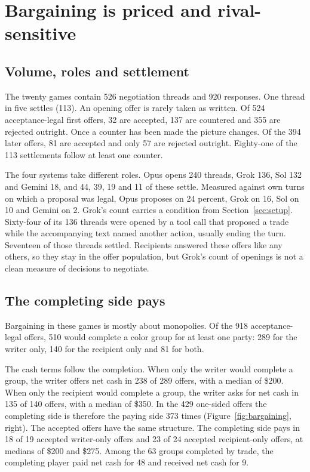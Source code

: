 \section{Bargaining is priced and rival-sensitive}
\label{sec:bargaining}

\subsection{Volume, roles and settlement}

The twenty games contain 526 negotiation threads and 920 responses. One thread in five settles (113). An opening offer is rarely taken as written. Of 524 acceptance-legal first offers, 32 are accepted, 137 are countered and 355 are rejected outright. Once a counter has been made the picture changes. Of the 394 later offers, 81 are accepted and only 57 are rejected outright. Eighty-one of the 113 settlements follow at least one counter.

The four systems take different roles. Opus opens 240 threads, Grok 136, Sol 132 and Gemini 18, and 44, 39, 19 and 11 of these settle. Measured against own turns on which a proposal was legal, Opus proposes on 24 percent, Grok on 16, Sol on 10 and Gemini on 2. Grok's count carries a condition from Section~\ref{sec:setup}. Sixty-four of its 136 threads were opened by a tool call that proposed a trade while the accompanying text named another action, usually ending the turn. Seventeen of those threads settled. Recipients answered these offers like any others, so they stay in the offer population, but Grok's count of openings is not a clean measure of decisions to negotiate.

\subsection{The completing side pays}

Bargaining in these games is mostly about monopolies. Of the 918 acceptance-legal offers, 510 would complete a color group for at least one party: 289 for the writer only, 140 for the recipient only and 81 for both.

The cash terms follow the completion. When only the writer would complete a group, the writer offers net cash in 238 of 289 offers, with a median of \$200. When only the recipient would complete a group, the writer asks for net cash in 135 of 140 offers, with a median of \$350. In the 429 one-sided offers the completing side is therefore the paying side 373 times (Figure~\ref{fig:bargaining}, right). The accepted offers have the same structure. The completing side pays in 18 of 19 accepted writer-only offers and 23 of 24 accepted recipient-only offers, at medians of \$200 and \$275. Among the 63 groups completed by trade, the completing player paid net cash for 48 and received net cash for 9.

